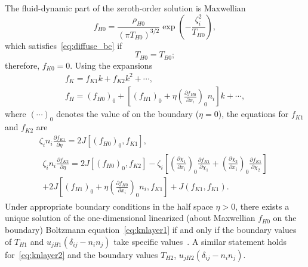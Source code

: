 \documentclass[10pt]{article}
\newcommand{\pder}[2][]{\frac{\partial#1}{\partial#2}}
\newcommand{\deltann}[2]{(\delta_{#1#2}-n_#1 n_#2)}
\newcommand{\onwall}[1]{\left(#1\right)_0}
\begin{document}
The fluid-dynamic part of the zeroth-order solution is Maxwellian
\begin{equation}\label{eq:fH0_solution}
    f_{H0} = \frac{\rho_{H0}}{(\pi T_{H0})^{3/2}}\exp\left(-\frac{\zeta_i^2}{T_{H0}}\right),
\end{equation}
which satisfies~\eqref{eq:diffuse_bc} if
\begin{equation}\label{eq:boundary_T0}
    T_{H0} = T_{B0};
\end{equation}
therefore, \(f_{K0} = 0\). Using the expansions
\begin{gather}
    f_K = f_{K1}k + f_{K2}k^2 + \cdots, \label{eq:knlayer_expansion}\\
    f_H = \onwall{f_{H0}} + \left[\onwall{f_{H1}} + \eta\onwall{\pder[f_{H0}]{x_i}}n_i \right]k + \cdots, \label{eq:Honwall_expansion}
\end{gather}
where \(\onwall{\cdots}\) denotes the value of on the boundary (\(\eta=0\)),
the equations for \(f_{K1}\) and \(f_{K2}\) are
\begin{gather}
    \zeta_in_i\pder[f_{K1}]{\eta} = 2J\left[\onwall{f_{H0}},f_{K1}\right], \label{eq:knlayer1}\\
    \begin{multlined}
        \zeta_in_i\pder[f_{K2}]{\eta} = 2J\left[\onwall{f_{H0}}, f_{K2}\right]
        - \zeta_i\left[\onwall{\pder[\chi_1]{x_i}}\pder[f_{K1}]{\chi_1} + \onwall{\pder[\chi_2]{x_i}}\pder[f_{K1}]{\chi_2}\right] \\
        + 2J\left[\onwall{f_{H1}}+\eta\onwall{\pder[f_{H0}]{x_i}}n_i,f_{K1}\right] + J(f_{K1},f_{K1}).
    \end{multlined}\label{eq:knlayer2}
\end{gather}
Under appropriate boundary conditions in the half space \(\eta>0\), there exists a unique solution of
the one-dimensional linearized (about Maxwellian \(f_{H0}\) on the boundary) Boltzmann equation~\eqref{eq:knlayer1}
if and only if the boundary values of \(T_{H1}\) and \(u_{jH1}\deltann{i}{j}\) take specific values~\cite{Maslova1982, Bardos1986}.
A similar statement holds for~\eqref{eq:knlayer2} and the boundary values \(T_{H2}\), \(u_{jH2}\deltann{i}{j}\).
\end{document}
